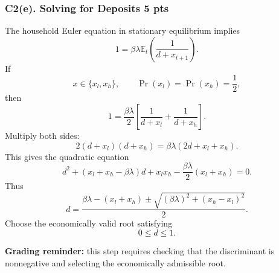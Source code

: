 \documentclass[11pt]{article}
\begin{document}
\subsubsection*{C2(e). Solving for Deposits \hfill 5 pts}

The household Euler equation in stationary equilibrium implies
\[
1
=
\beta\lambda \mathbb{E}_t\left(\frac{1}{d+x_{t+1}}\right).
\]
If
\[
x\in\{x_l,x_h\},
\qquad
\Pr(x_l)=\Pr(x_h)=\frac12,
\]
then
\[
1
=
\frac{\beta\lambda}{2}
\left[
\frac{1}{d+x_l}
+
\frac{1}{d+x_h}
\right].
\]
Multiply both sides:
\[
2(d+x_l)(d+x_h)
=
\beta\lambda(2d+x_l+x_h).
\]
This gives the quadratic equation
\[
d^2
+
(x_l+x_h-\beta\lambda)d
+
x_lx_h
-\frac{\beta\lambda}{2}(x_l+x_h)
=
0.
\]
Thus
\[
d
=
\frac{
\beta\lambda-(x_l+x_h)
\pm
\sqrt{
(\beta\lambda)^2+(x_h-x_l)^2
}
}{2}.
\]
Choose the economically valid root satisfying
\[
0\leq d\leq 1.
\]

\textbf{Grading reminder:} this step requires checking that the discriminant is nonnegative and selecting the economically admissible root.
\end{document}
